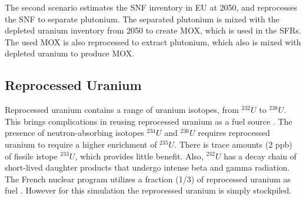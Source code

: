 The second scenario estimates the \gls{SNF} inventory in \gls{EU} at 2050,
and reprocesses the \gls{SNF} to separate plutonium. The separated
plutonium is mixed with the depleted uranium inventory from 2050
to create \gls{MOX}, which is used in the \gls{SFR}s. The used
\gls{MOX} is also reprocessed to extract plutonium, which also
is mixed with depleted uranium to produce \gls{MOX}.



\subsection{Reprocessed Uranium}
Reprocessed uranium contains a range of uranium isotopes, from $^{232}U$ to $^{238}U$.
This brings complications in reusing reprocessed uranium as a fuel source \cite{IAEA_management_2007}.
The presence of neutron-absorbing isotopes $^{234}U$ and $^{236}U$ requires reprocessed uranium
to require a higher enrichment of $^{235}U$. There is trace amounts (2 ppb) of fissile istope $^{233}U$,
which provides little benefit.  
Also, $^{232}U$ has a decay chain of short-lived
daughter products that undergo intense beta and gamma radiation.
The French nuclear program utilizes a fraction (1/3) of reprocessed uranium as fuel \cite{IAEA_management_2007}.
However for this simulation the reprocessed uranium is simply stockpiled.


